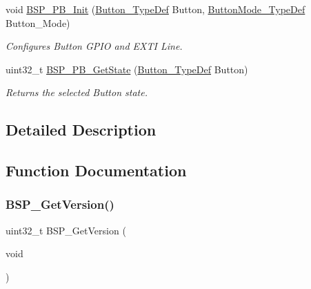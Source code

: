 \begin{DoxyCompactItemize}
void \hyperlink{group__B-L072Z-LRWAN1__LOW__LEVEL__Exported__Functions_gacfde520fe598ece32657c56408354d2e}{B\+S\+P\+\_\+\+P\+B\+\_\+\+Init} (\hyperlink{group__B-L072Z-LRWAN1__LOW__LEVEL__Exported__Types_ga643816dfbad5c734fc25a29ce8d35bb1}{Button\+\_\+\+Type\+Def} Button, \hyperlink{group__B-L072Z-LRWAN1__LOW__LEVEL__Exported__Types_ga48825b7c7d851c440ef8e808fd9d8f0a}{Button\+Mode\+\_\+\+Type\+Def} Button\+\_\+\+Mode)
\begin{DoxyCompactList}\small\item\em Configures Button G\+P\+IO and E\+X\+TI Line. \end{DoxyCompactList}\item 
uint32\+\_\+t \hyperlink{group__B-L072Z-LRWAN1__LOW__LEVEL__Exported__Functions_ga8f0978b6cffda9c67266ddfdb3a0abf7}{B\+S\+P\+\_\+\+P\+B\+\_\+\+Get\+State} (\hyperlink{group__B-L072Z-LRWAN1__LOW__LEVEL__Exported__Types_ga643816dfbad5c734fc25a29ce8d35bb1}{Button\+\_\+\+Type\+Def} Button)
\begin{DoxyCompactList}\small\item\em Returns the selected Button state. \end{DoxyCompactList}\end{DoxyCompactItemize}


\subsection{Detailed Description}


\subsection{Function Documentation}
\mbox{\label{group__B-L072Z-LRWAN1__LOW__LEVEL__Exported__Functions_ga65d13608f7010a8068614154cb142cd6}} 
\subsubsection{\texorpdfstring{B\+S\+P\+\_\+\+Get\+Version()}{BSP\_GetVersion()}}
{\footnotesize\ttfamily uint32\+\_\+t B\+S\+P\+\_\+\+Get\+Version (\begin{DoxyParamCaption}\item[{void}]{ }\end{DoxyParamCaption})}




